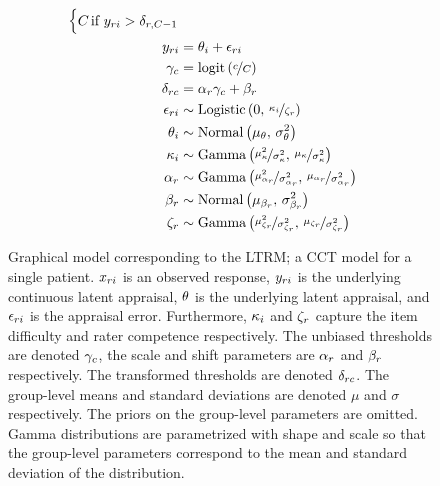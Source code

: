\documentclass[a4paper,usenames,dvipsnames]{article}
\begin{document}
\begin{figure}[!ht]
\begin{minipage}{0.5\textwidth}
{\begin{align*}
\begin{cases}
			\Tncat	&\hspace{-.3cm} \text{if } \Appraisal_{\Irater\Iitem} > \Threshold_{\Irater, \Tncat-1}
			\end{cases}\\
			\Appraisal_{\Irater\Iitem} &\assignment \ItemTruth_\Iitem + \Error_{\Irater\Iitem}\\
			\UnBiasedThreshold_\Incat &\assignment \logit{\nicefrac{\Incat}{\Tncat}}\\
			\Threshold_{\Irater\Incat} &\assignment \RaterScale_\Irater \gamma_\Incat + \RaterShift_\Irater\\
			\Error_{\Irater\Iitem}   &\sim \dlogis{0}{\nicefrac{\ItemDifficulty_\Iitem}{\RaterCompetence_\Irater}} \\
			\ItemTruth_\Iitem        &\sim \dnorm{\mu_\ItemTruth}{\sigma_\ItemTruth^2}\\
			\ItemDifficulty_\Iitem   &\sim \dgammaMV{\mu_\ItemDifficulty}{\sigma_\ItemDifficulty^2} \\
			\RaterScale_\Irater      &\sim \dgammaMV{\mu_{\RaterScale_\Irater}}{\sigma_{\RaterScale_\Irater}^2} \\
			\RaterShift_\Irater      &\sim \dnorm{\mu_{\RaterShift_\Irater}}{\sigma_{\RaterShift_\Irater}^2} \\
			\RaterCompetence_\Irater &\sim \dgammaMV{\mu_{\RaterCompetence_\Irater}}{\sigma_{\RaterCompetence_\Irater}^2} \\
		\end{align*}
		}%
	\end{minipage}
	\caption{Graphical model corresponding to the LTRM; a CCT model for a single patient. $x_{ri}$ is an observed response, $y_{ri}$ is the underlying continuous latent appraisal, $\theta$ is the underlying latent appraisal, and $\epsilon_{ri}$ is the appraisal error. Furthermore, $\kappa_i$ and $\zeta_r$ capture the item difficulty and rater competence respectively. The unbiased thresholds are denoted $\gamma_c$, the scale and shift parameters are $\alpha_r$ and $\beta_r$ respectively. The transformed thresholds are denoted $\delta_{rc}$. The group-level means and standard deviations are denoted $\mu$ and $\sigma$ respectively. The priors on the group-level parameters are omitted. Gamma distributions are parametrized with shape and scale so that the group-level parameters correspond to the mean and standard deviation of the distribution.}
	\label{model:LTRM}
\end{figure}
\end{document}
